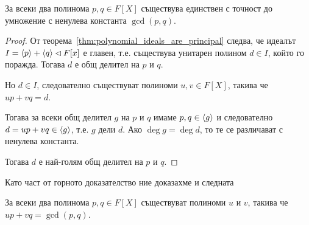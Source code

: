 \documentclass[numbers=endperiod, bibliography=totocnumbered]{scrartcl}
\begin{document}
\begin{theorem}
  За всеки два полинома \( p, q \in F[X] \) съществува единствен с точност до умножение с ненулева константа \( \gcd(p, q) \).
\end{theorem}
\begin{proof}
  От теорема~\ref{thm:polynomial_ideals_are_principal} следва, че идеалът \( I = \left\langle p \right\rangle + \left\langle q \right\rangle \lhd F[x] \) е главен, т.е. съществува унитарен полином \( d \in I \), който го поражда.
  Тогава \( d \) е общ делител на \( p \) и \( q \).

  Но \( d \in I \), следователно съществуват полиноми \( u, v \in F[X] \), такива че \( u p + v q = d \).

  Тогава за всеки общ делител \( g \) на \( p \) и \( q \) имаме \( p, q \in \left\langle g \right\rangle \) и следователно \( d = u p + v q \in \left\langle g \right\rangle \), т.е. \( g \) дели \( d \). Ако \( \deg g = \deg d \), то те се различават с ненулева константа.

  Тогава \( d \) е най-голям общ делител на \( p \) и \( q \).
\end{proof}

Като част от горното доказателство ние доказахме и следната
\begin{theorem}
  За всеки два полинома \( p, q \in F[X] \) съществуват полиноми \( u \) и \( v \), такива че \( u p + v q = \gcd(p, q) \).
\end{theorem}
\end{document}
